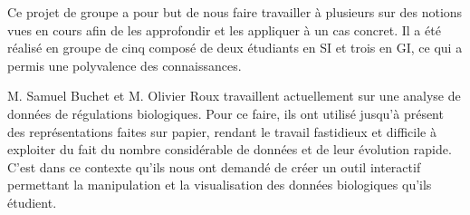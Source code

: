 Ce projet de groupe a pour but de nous faire travailler à plusieurs sur des notions vues en cours afin de les approfondir et les appliquer à un cas concret. Il a  été réalisé en groupe de cinq composé de deux étudiants en SI et trois en GI, ce qui a permis une polyvalence des connaissances. 
\newline 

M. Samuel Buchet et M. Olivier Roux travaillent actuellement sur une analyse de données de régulations biologiques. Pour ce faire, ils ont utilisé jusqu'à présent des représentations faites sur papier, rendant le travail fastidieux et difficile à exploiter du fait du nombre considérable de données et de leur évolution rapide. C'est dans ce contexte qu'ils nous ont demandé de créer un outil interactif permettant la manipulation et la visualisation des données biologiques qu'ils étudient. 

